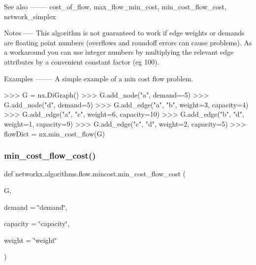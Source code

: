 \begin{DoxyVerb}
See also
--------
cost_of_flow, max_flow_min_cost, min_cost_flow_cost, network_simplex

Notes
-----
This algorithm is not guaranteed to work if edge weights or demands
are floating point numbers (overflows and roundoff errors can
cause problems). As a workaround you can use integer numbers by
multiplying the relevant edge attributes by a convenient
constant factor (eg 100).

Examples
--------
A simple example of a min cost flow problem.

>>> G = nx.DiGraph()
>>> G.add_node("a", demand=-5)
>>> G.add_node("d", demand=5)
>>> G.add_edge("a", "b", weight=3, capacity=4)
>>> G.add_edge("a", "c", weight=6, capacity=10)
>>> G.add_edge("b", "d", weight=1, capacity=9)
>>> G.add_edge("c", "d", weight=2, capacity=5)
>>> flowDict = nx.min_cost_flow(G)
\end{DoxyVerb}
 \mbox{\label{namespacenetworkx_1_1algorithms_1_1flow_1_1mincost_aeb9bc47d477c57c0b0bd04161bae05bc}} 
\subsubsection{\texorpdfstring{min\+\_\+cost\+\_\+flow\+\_\+cost()}{min\_cost\_flow\_cost()}}
{\footnotesize\ttfamily def networkx.\+algorithms.\+flow.\+mincost.\+min\+\_\+cost\+\_\+flow\+\_\+cost (\begin{DoxyParamCaption}\item[{}]{G,  }\item[{}]{demand = {\ttfamily \char`\"{}demand\char`\"{}},  }\item[{}]{capacity = {\ttfamily \char`\"{}capacity\char`\"{}},  }\item[{}]{weight = {\ttfamily \char`\"{}weight\char`\"{}} }\end{DoxyParamCaption})}

